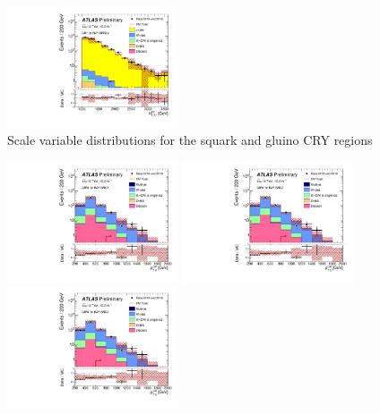 \begin{figure}[tbp]
\begin{center}
\includegraphics[width=0.45\textwidth]{figures/ATLAS-CONF-2016-078_INT/N-1Plots/AtlasStyle/Preliminary/CRY_SRJigsawSRS3a_LastCut_CRY_minusone}
\end{center}
\caption{Scale variable distributions for the squark and gluino CRY regions}
\label{fig:CRY_SRJigsawSRG1a_LastCut_CRY_minusone}
\end{figure}


\begin{figure}[tbp]
\begin{center}
\includegraphics[width=0.45\textwidth]{figures/ATLAS-CONF-2016-078_INT/N-1Plots/AtlasStyle/Preliminary/CRW_SRJigsawSRC1_LastCut_CRW_minusone}
\includegraphics[width=0.45\textwidth]{figures/ATLAS-CONF-2016-078_INT/N-1Plots/AtlasStyle/Preliminary/CRW_SRJigsawSRC2_LastCut_CRW_minusone}
\includegraphics[width=0.45\textwidth]{figures/ATLAS-CONF-2016-078_INT/N-1Plots/AtlasStyle/Preliminary/CRW_SRJigsawSRC3_LastCut_CRW_minusone}

\end{center}
\end{figure}
